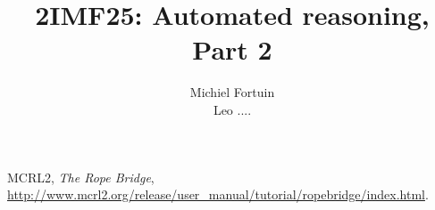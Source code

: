 \documentclass[11pt,a4paper]{report}
\title{2IMF25: Automated reasoning, Part 2}
\author{Michiel Fortuin\\Leo ....}
\begin{document}
\maketitle

\setcounter{tocdepth}{1}
\tableofcontents





\begin{thebibliography}{9}
	
	MCRL2,
	\emph{The Rope Bridge},
	\url{http://www.mcrl2.org/release/user_manual/tutorial/ropebridge/index.html}.
	
\end{thebibliography}
\end{document}
